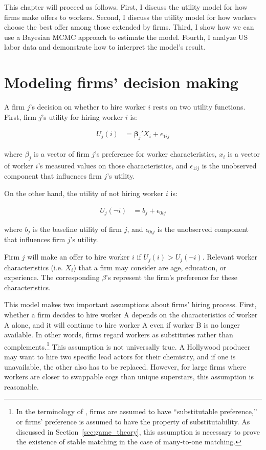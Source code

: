 This chapter will proceed as follows. First, I discuss the utility model for how
firms make offers to workers. Second, I discuss the utility model for how
workers choose the best offer among those extended by firms. Third, I show how
we can use a Bayesian MCMC
approach to estimate the model. Fourth, I analyze US labor data and demonstrate how to
interpret the model's result.

\section{Modeling firms' decision making}
\label{sec:model_firm_decision_making}

A firm $j$'s decision on whether to hire worker $i$ rests on two utility
functions. First, firm $j$'s utility for hiring worker $i$ is:

\begin{align}
  U_j(i) &= \bm{\beta}_j' X_i + \epsilon_{1ij}
\end{align}

where $\beta_j$ is a vector of firm $j$'s preference for worker characteristics,
$x_i$ is a vector of worker $i$'s measured values on those characteristics, and
$\epsilon_{1ij}$ is the unobserved component that influences firm $j$'s utility.

On the other hand, the utility of not hiring worker $i$ is:

\begin{align}
  U_j(\neg i) &= b_j + \epsilon_{0ij}
\end{align}

where $b_j$ is the baseline utility of firm $j$, and $\epsilon_{0ij}$ is the
unobserved component that influences firm $j$'s utility.

Firm $j$ will make an offer to hire worker $i$ if $U_j(i) > U_j(\neg i)$.
Relevant worker characteristics (i.e. $X_i$) that a firm may consider are age,
education, or experience. The corresponding $\beta$'s represent the firm's
preference for these characteristics.

This model makes two important assumptions about firms' hiring process. First,
whether a firm decides to hire worker A depends on the characteristics of worker
A alone, and it will continue to hire worker A even if worker B is no longer
available. In other words, firms regard workers as substitutes rather than
complements.\footnote{In the terminology of \citet{Roth1992}, firms are assumed
  to have ``substitutable preference,'' or firms' preference is assumed to have
  the property of substitutability. As discussed in
  Section~\ref{sec:game_theory}, this assumption is necessary to prove the
  existence of stable matching in the case of many-to-one matching.} This
assumption is not universally true. A Hollywood producer may want to hire two
specific lead actors for their chemistry, and if one is unavailable, the other
also has to be replaced. However, for large firms where workers are closer to
swappable cogs than unique superstars, this assumption is reasonable.

